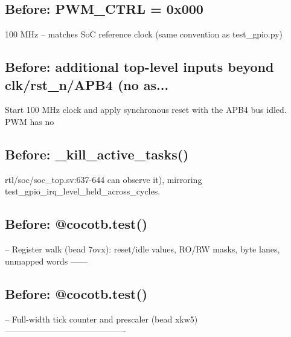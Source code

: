 \begin{record}

\subsection*{Before: PWM\_CTRL = 0x000}

\begin{textblock}
100 MHz -- matches SoC reference clock (same convention as test_gpio.py)
\end{textblock}

\subsection*{Before: additional top-level inputs beyond clk/rst\_n/APB4 (no as...}

\begin{textblock}
Start 100 MHz clock and apply synchronous reset with the APB4 bus idled. PWM has no
\end{textblock}

\subsection*{Before: \_kill\_active\_tasks()}

\begin{textblock}
rtl/soc/soc_top.sv:637-644 can observe it), mirroring test_gpio_irq_level_held_across_cycles.
\end{textblock}

\subsection*{Before: @cocotb.test()}

\begin{textblock}
-- Register walk (bead 7ovx): reset/idle values, RO/RW masks, byte lanes, unmapped words ------
\end{textblock}

\subsection*{Before: @cocotb.test()}

\begin{textblock}
-- Full-width tick counter and prescaler (bead xkw5) -------------------------------------------
\end{textblock}

\end{record}

